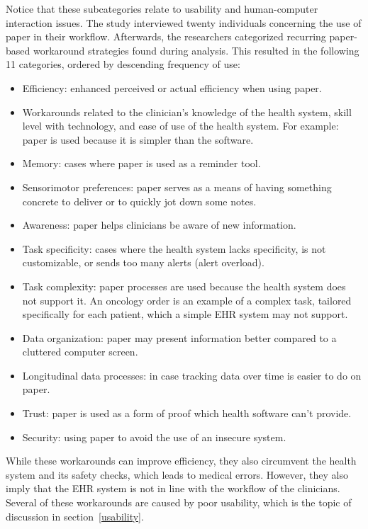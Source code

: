     \noindent Notice that these subcategories relate to usability and human-computer interaction issues. The study interviewed twenty individuals concerning the use of paper in their workflow. Afterwards, the researchers categorized recurring paper-based workaround strategies found during analysis. This resulted in the following 11 categories, ordered by descending frequency of use:
    \begin{itemize}
        \item Efficiency: enhanced perceived or actual efficiency when using paper.
        \item Workarounds related to the clinician's knowledge of the health system, skill level with technology, and ease of use of the health system. For example: paper is used because it is simpler than the software.
        \item Memory: cases where paper is used as a reminder tool.
        \item Sensorimotor preferences: paper serves as a means of having something concrete to deliver or to quickly jot down some notes.
        \item Awareness: paper helps clinicians be aware of new information.
        \item Task specificity: cases where the health system lacks specificity, is not customizable, or sends too many alerts (alert overload).
        \item Task complexity: paper processes are used because the health system does not support it. An oncology order is an example of a complex task, tailored specifically for each patient, which a simple EHR system may not support.
        \item Data organization: paper may present information better compared to a cluttered computer screen.
        \item Longitudinal data processes: in case tracking data over time is easier to do on paper.
        \item Trust: paper is used as a form of proof which health software can't provide.
        \item Security: using paper to avoid the use of an insecure system.
    \end{itemize}

    \noindent While these workarounds can improve efficiency, they also circumvent the health system and its safety checks, which leads to medical errors. However, they also imply that the EHR system is not in line with the workflow of the clinicians. Several of these workarounds are caused by poor usability, which is the topic of discussion in section~\ref{usability}.

